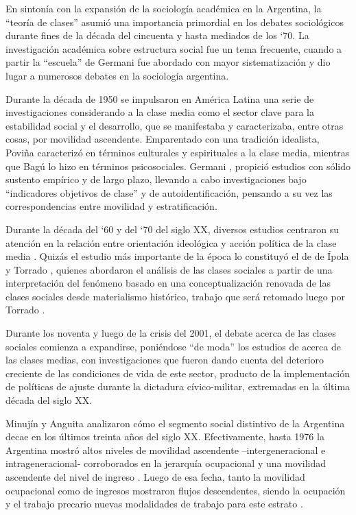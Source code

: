 \documentclass[
]{book}
\begin{document}
En sintonía con la expansión de la sociología académica en la Argentina, la ``teoría de clases'' asumió una importancia primordial en los debates sociológicos durante fines de la década del cincuenta y hasta mediados de los `70. La investigación académica sobre estructura social fue un tema frecuente, cuando a partir la ``escuela'' de Germani \citeyearpar{Germani1987} fue abordado con mayor sistematización y dio lugar a numerosos debates en la sociología argentina.

Durante la década de 1950 se impulsaron en América Latina una serie de investigaciones considerando a la clase media como el sector clave para la estabilidad social y el desarrollo, que se manifestaba y caracterizaba, entre otras cosas, por movilidad ascendente. Emparentado con una tradición idealista, Poviña \citeyearpar{Povina1950} caracterizó en términos culturales y espirituales a la clase media, mientras que Bagú \citeyearpar{Bagu1959} lo hizo en términos psicosociales. Germani \citetext{\citeyear{Germani1944}; \citeyear{Germani1963}; \citeyear{Germani1981}}, propició estudios con sólido sustento empírico y de largo plazo, llevando a cabo investigaciones bajo ``indicadores objetivos de clase'' y de autoidentificación, pensando a su vez las correspondencias entre movilidad y estratificación.

Durante la década del `60 y del `70 del siglo XX, diversos estudios centraron su atención en la relación entre orientación ideológica y acción política de la clase media \citep{Graciarena1971, Tedesco1973}. Quizás el estudio más importante de la época lo constituyó el de de Ípola y Torrado \citeyearpar{Ipola1976}, quienes abordaron el análisis de las clases sociales a partir de una interpretación del fenómeno basado en una conceptualización renovada de las clases sociales desde materialismo histórico, trabajo que será retomado luego por Torrado \citeyearpar{Torrado1992}.

Durante los noventa y luego de la crisis del 2001, el debate acerca de las clases sociales comienza a expandirse, poniéndose ``de moda'' los estudios de acerca de las clases medias, con investigaciones que fueron dando cuenta del deterioro creciente de las condiciones de vida de este sector, producto de la implementación de políticas de ajuste durante la dictadura cívico-militar, extremadas en la última década del siglo XX.

Minujín y Anguita \citeyearpar{Minujin2004} analizaron cómo el segmento social distintivo de la Argentina decae en los últimos treinta años del siglo XX. Efectivamente, hasta 1976 la Argentina mostró altos niveles de movilidad ascendente --intergeneracional e intrageneracional- corroborados en la jerarquía ocupacional y una movilidad ascendente del nivel de ingreso \citep{Torrado2007}. Luego de esa fecha, tanto la movilidad ocupacional como de ingresos mostraron flujos descendentes, siendo la ocupación y el trabajo precario nuevas modalidades de trabajo para este estrato \citep{Lindenboim2007, Monza1986, Orsatti1985}.
\end{document}
